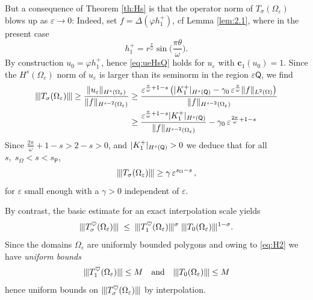 \documentclass[titlepage,12pt]{amsart}
\theoremstyle{definition}
\theoremstyle{remark}
\numberwithin{equation}{section}
\newcommand{\ee}{\hskip0.15ex}
\newcommand{\me}{\hskip-0.15ex}
\newcommand{\dd}[1]{_{\raise-0.6ex\hbox{$\scriptstyle #1$}}}
\newcommand {\Norm}[2]{ \mathchoice
    {|\ee #1\ee|\dd{#2}\,}
    {| #1 |_{#2}}
    {| #1 |_{#2}}
    {| #1 |_{#2}} }
\newcommand {\DNorm}[2]{ \mathchoice
    {\|\ee #1\ee\|\dd{#2}\,}
    {\| #1 \|_{#2}}
    {\| #1 \|_{#2}}
    {\| #1 \|_{#2}} }
\newcommand{\rP}{{\mathsf{P}}}
\newcommand{\rQ}{{\mathsf{Q}}}
\begin{document}
But a consequence of Theorem \ref{th:Hs} is that the operator norm of $T_\sigma(\Omega_\varepsilon)$ blows up as $\varepsilon\to 0$: Indeed, set $f=\Delta(\varphi h^+_1)$, cf Lemma \ref{lem:2.1}, where in the present case
\[
   h^+_1 = r^{\frac{\pi}{\omega}} \sin\big(\frac{\pi\theta}{\omega}\big).
\]
By construction $u_0=\varphi h^+_1$, hence \eqref{eq:ueHsQ} holds for $u_\varepsilon$ with $\mathbf{c}_1(u_0)=1$.
Since the  $H^s(\Omega_\varepsilon)$ norm of $u_\varepsilon$ is larger than its seminorm in the region $\varepsilon\rQ$, we find
\[
\begin{aligned}
   |\me|\me| T_\sigma(\Omega_\varepsilon) |\me|\me| \ge 
   \frac{\DNorm{u_\varepsilon}{H^s(\Omega_\varepsilon)}}{\DNorm{f}{H^{s-2}(\Omega_\varepsilon)}} 
   &\ge
   \frac{\varepsilon^{\frac{\pi}{\omega}+1-s} \left( 
   \Norm{K^+_1}{H^s(\rQ)}
   - \gamma_0\,\varepsilon^{\frac{\pi}{\omega}} \DNorm{f}{L^2(\Omega)}
   \right)}{\DNorm{f}{H^{s-2}(\Omega_\varepsilon)}} \\
   &\ge
   \frac{\varepsilon^{\frac{\pi}{\omega}+1-s}  
   \Norm{K^+_1}{H^s(\rQ)}}{\DNorm{f}{H^{s-2}(\Omega_\varepsilon)}}
   - \gamma_0\,\varepsilon^{\frac{2\pi}{\omega}+1-s} 
\end{aligned}
\]
Since $\frac{2\pi}{\omega}+1-s>2-s>0$, and $\Norm{K^+_1}{H^s(\rQ)}>0$ we deduce that for all $s,\; s_\Omega<s<s_\rP$,
\begin{equation}
\label{eq:Tsig}
   |\me|\me| T_\sigma(\Omega_\varepsilon) |\me|\me| \ge 
   \gamma\, \varepsilon^{s_\Omega-s}\,,
\end{equation}
for $\varepsilon$ small enough with a $\gamma>0$ independent of $\varepsilon$.

By contrast, the basic estimate for an exact interpolation scale
yields
\[
   |\me|\me| T_\sigma^\heartsuit(\Omega_\varepsilon) |\me|\me| \;\le\;
   |\me|\me| T_1^\heartsuit(\Omega_\varepsilon) |\me|\me|^{\sigma} \;
   |\me|\me| T_0(\Omega_\varepsilon) |\me|\me|^{1-\sigma}.
\]
Since the domains $\Omega_\varepsilon$ are uniformly bounded polygons and owing to \eqref{eq:H2} we have {\em uniform bounds}
\[
   |\me|\me| T^\heartsuit_1(\Omega_\varepsilon) |\me|\me| \le M
   \quad\mbox{and}\quad
   |\me|\me| T_0(\Omega_\varepsilon) |\me|\me| \le M
\]
hence uniform bounds on $|\me|\me| T_\sigma^\heartsuit(\Omega_\varepsilon) |\me|\me|$ by interpolation. 
\end{document}
